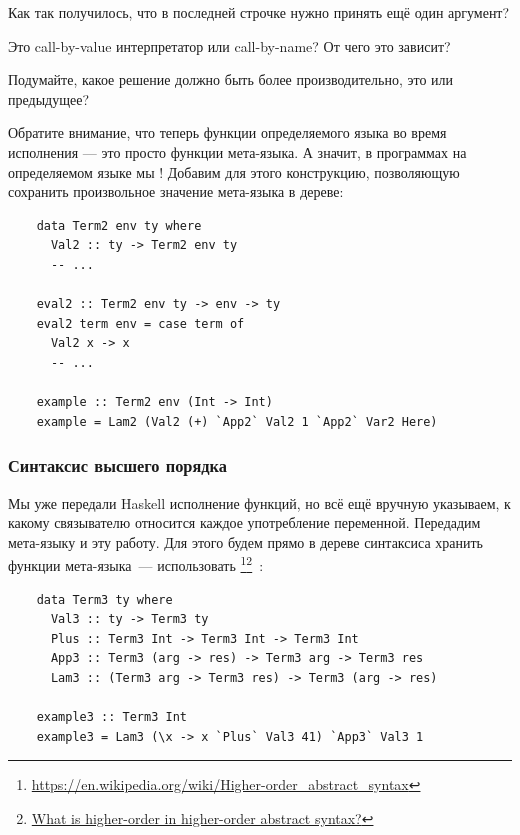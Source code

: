 \begin{task}
    Как так получилось, что в последней строчке нужно принять ещё один аргумент?
\end{task}

\begin{task}
    Это call-by-value интерпретатор или call-by-name?
    От чего это зависит?
\end{task}

\begin{task}
    Подумайте, какое решение должно быть более производительно, это или предыдущее?
\end{task}

Обратите внимание, что теперь функции определяемого языка во время исполнения --- это просто функции мета-языка.
А значит, в программах на определяемом языке мы !
Добавим для этого конструкцию, позволяющую сохранить произвольное значение мета-языка в дереве:
\begin{verbatim}
    data Term2 env ty where
      Val2 :: ty -> Term2 env ty
      -- ...

    eval2 :: Term2 env ty -> env -> ty
    eval2 term env = case term of
      Val2 x -> x
      -- ...

    example :: Term2 env (Int -> Int)
    example = Lam2 (Val2 (+) `App2` Val2 1 `App2` Var2 Here)
\end{verbatim}

\subsubsection{Синтаксис высшего порядка} \label{subsubsec:h-syntax}

Мы уже передали Haskell исполнение функций, но всё ещё вручную указываем, к какому связывателю относится каждое употребление переменной.
Передадим мета-языку и эту работу.
Для этого будем прямо в дереве синтаксиса хранить функции мета-языка~--- использовать \footnote{\url{https://en.wikipedia.org/wiki/Higher-order_abstract_syntax}}\footnote{\href{https://cstheory.stackexchange.com/questions/20071/what-is-higher-order-in-higher-order-abstract-syntax}{What is higher-order in higher-order abstract syntax?}}~\cite{pfenning1988higher}:
\begin{verbatim}
    data Term3 ty where
      Val3 :: ty -> Term3 ty
      Plus :: Term3 Int -> Term3 Int -> Term3 Int
      App3 :: Term3 (arg -> res) -> Term3 arg -> Term3 res
      Lam3 :: (Term3 arg -> Term3 res) -> Term3 (arg -> res)

    example3 :: Term3 Int
    example3 = Lam3 (\x -> x `Plus` Val3 41) `App3` Val3 1
\end{verbatim}

